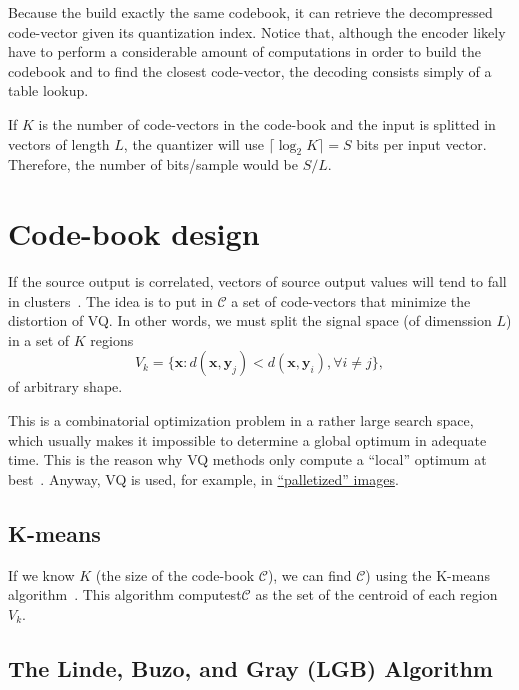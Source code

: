 Because the build exactly the same codebook, it can retrieve the
decompressed code-vector given its quantization index. Notice that,
although the encoder likely have to perform a considerable amount of
computations in order to build the codebook and to find the closest
code-vector, the decoding consists simply of a table lookup.

If $K$ is the number of code-vectors in the code-book and the input is
splitted in vectors of length $L$, the quantizer will use
$\lceil\log_2 K\rceil=S$ bits per input vector. Therefore, the number
of bits/sample would be $S/L$.


\section{Code-book design}

If the source output is correlated, vectors of source output values
will tend to fall in clusters~\cite{sayood2017introduction}. The idea
is to put in $\mathcal{C}$ a set of code-vectors that minimize the
distortion of VQ. In other words, we must split the signal space (of
dimenssion $L$) in a set of $K$ regions
\begin{equation}
  V_k=\{\mathbf{x}:d(\mathbf{x},\mathbf{y}_j) <
  d(\mathbf{x},\mathbf{y}_i), \forall i\ne j\},
\end{equation}
of arbitrary shape.


This is a combinatorial optimization problem in a rather large search
space, which usually makes it impossible to determine a global optimum
in adequate time. This is the reason why VQ methods only compute a
``local'' optimum at best~\cite{burger2016digital}. Anyway, VQ is
used, for example, in
\href{https://en.wikipedia.org/wiki/Palette_(computing)}{``palletized''
  images}.
  

\subsection{K-means}

If we know $K$ (the size of the code-book $\mathcal{C}$), we can find
$\mathcal{C}$) using the K-means
algorithm~\cite{hartigan1979algorithm,sayood2017introduction}. This
algorithm computest$\mathcal{C}$ as the set of the centroid of each
region $V_k$.

\subsection{The Linde, Buzo, and Gray (LGB) Algorithm}

